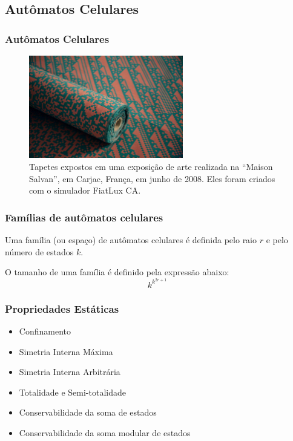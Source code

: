 \documentclass[aspectratio=43,hyperref={pdfpagelabels=false}]{beamer}
\begin{document}
 \subsection*{Autômatos Celulares}
 \begin{frame}
    \frametitle{Autômatos Celulares}

    \begin{figure}[h!]
        \centering
        \includegraphics[width=0.6\textwidth]{fig_carpet.jpg}
        \caption{Tapetes expostos em uma exposição de arte realizada na ``Maison Salvan'', em Carjac, França, em junho de 2008. Eles foram criados com o simulador FiatLux CA.}
    \end{figure}

 \end{frame}

  



\begin{frame}
\frametitle{Famílias de autômatos celulares}
Uma família (ou espaço) de autômatos celulares é definida pelo raio $r$ e pelo número de estados $k$.

O tamanho de uma família é definido pela expressão abaixo:
\begin{equation}
k^{k^{2r+1}}
\label{eq:tamFamilia}
\end{equation}
\end{frame}

 \begin{frame}
     \frametitle{Propriedades Estáticas}
     \begin{itemize}
           \item Confinamento
           \item Simetria Interna Máxima
           \item Simetria Interna Arbitrária
           \item Totalidade e Semi-totalidade
           \item Conservabilidade da soma de estados
           \item Conservabilidade da soma modular de estados %
     \end{itemize}
 \end{frame}
\end{document}
